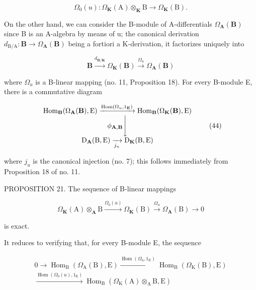 \[
\Omega_ {0} (u): \Omega_ {\mathbf {K}} (\mathrm{A}) \otimes_ {\mathbf {K}} \mathrm{B} \rightarrow \Omega_ {\mathbf {K}} (\mathrm{B}).\tag{43}
\]

On the other hand, we can consider the B-module of A-differentials \(\Omega_{\mathbf{A}}(\mathbf{B})\) since B is an A-algebra by means of u; the canonical derivation \(d_{\mathrm{B/A}}: \mathbf{B} \to \Omega_{\mathbf{A}}(\mathbf{B})\) being a fortiori a K-derivation, it factorizes uniquely into

\[
\mathbf {B} \xrightarrow {d _ {\mathbf {B} / \mathbf {K}}} \Omega_ {\mathbf {K}} (\mathbf {B}) \xrightarrow {\Omega_ {u}} \Omega_ {\mathbf {A}} (\mathbf {B})
\]

where \(\Omega_{u}\) is a B-linear mapping (no. 11, Proposition 18). For every B-module E, there is a commutative diagram

\[
\begin{array}{c} \operatorname{Hom} _ {\mathbf {B}} (\Omega_ {\mathbf {A}} (\mathbf {B}), \mathrm{E}) \xrightarrow {\operatorname{Hom} (\Omega_ {u} , 1 _ {\mathbf {E}})} \operatorname{Hom} _ {\mathbf {B}} (\Omega_ {\mathbf {K}} (\mathbf {B}), \mathrm{E}) \\ \phi_ {\mathbf {A}, \mathbf {B}} \Biggl \downarrow \\ \mathrm{D} _ {\mathbf {A}} (\mathrm{B}, \mathrm{E}) \xrightarrow [ j _ {u} ]{} \mathrm{D} _ {\mathbf {K}} (\mathrm{B}, \mathrm{E}) \end{array}\tag{44}
\]

where \(j_{u}\) is the canonical injection (no. 7); this follows immediately from Proposition 18 of no. 11.

PROPOSITION 21. The sequence of B-linear mappings

\[
\Omega_ {\mathbf {K}} (\mathrm{A}) \otimes_ {\mathbf {A}} \mathrm{B} \xrightarrow {\Omega_ {0} (u)} \Omega_ {\mathbf {K}} (\mathrm{B}) \xrightarrow {\Omega_ {u}} \Omega_ {\mathbf {A}} (\mathrm{B}) \to 0\tag{45}
\]

is exact.

It reduces to verifying that, for every B-module E, the sequence

\[
\begin{array}{c} 0 \to \operatorname{Hom} _ {\mathrm{B}} (\Omega_ {\mathrm{A}} (\mathrm{B}), \mathrm{E}) \xrightarrow {\operatorname{Hom} (\Omega_ {\mathrm{u}} , 1 _ {\mathrm{E}})} \operatorname{Hom} _ {\mathrm{B}} (\Omega_ {\mathrm{K}} (\mathrm{B}), \mathrm{E}) \\ \xrightarrow {\operatorname{Hom} (\Omega_ {0} (u) , 1 _ {\mathrm{E}})} \operatorname{Hom} _ {\mathrm{B}} (\Omega_ {\mathrm{K}} (\mathrm{A}) \otimes_ {\mathrm{A}} \mathrm{B}, \mathrm{E}) \end{array}
\]

